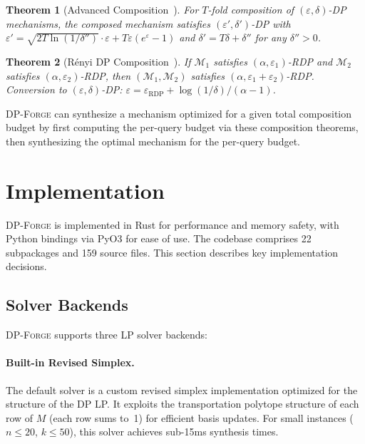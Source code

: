 \documentclass[11pt,a4paper]{article}
\newcommand{\dpforge}{\textsc{DP-Forge}}
\newcommand{\eps}{\varepsilon}
\newcommand{\cM}{\mathcal{M}}
\newtheorem{theorem}{Theorem}[section]
\begin{document}
\begin{theorem}[Advanced Composition~\cite{dwork2010boosting,kairouz2015composition}]
\label{thm:advanced_comp}
For $T$-fold composition of $(\eps, \delta)$-DP mechanisms, the composed
mechanism satisfies $(\eps', \delta')$-DP with
$\eps' = \sqrt{2T \ln(1/\delta'')} \cdot \eps + T\eps(e^\eps - 1)$
and $\delta' = T\delta + \delta''$ for any $\delta'' > 0$.
\end{theorem}

\begin{theorem}[R\'enyi DP Composition~\cite{mironov2017renyi}]
\label{thm:rdp_comp}
If $\cM_1$ satisfies $(\alpha, \eps_1)$-RDP and $\cM_2$ satisfies
$(\alpha, \eps_2)$-RDP, then $(\cM_1, \cM_2)$ satisfies
$(\alpha, \eps_1 + \eps_2)$-RDP.  Conversion to $(\eps, \delta)$-DP:
$\eps = \eps_{\text{RDP}} + \log(1/\delta)/(\alpha - 1)$.
\end{theorem}

\dpforge{} can synthesize a mechanism optimized for a given total composition
budget by first computing the per-query budget via these composition theorems,
then synthesizing the optimal mechanism for the per-query budget.


\section{Implementation}
\label{sec:implementation}

\dpforge{} is implemented in Rust for performance and memory safety, with Python
bindings via PyO3 for ease of use.  The codebase comprises 22 subpackages and
159 source files.  This section describes key implementation decisions.

\subsection{Solver Backends}
\label{subsec:solvers}

\dpforge{} supports three LP solver backends:

\paragraph{Built-in Revised Simplex.}
The default solver is a custom revised simplex implementation optimized for the
structure of the DP LP.  It exploits the transportation polytope structure of each
row of $M$ (each row sums to~1) for efficient basis updates.  For small instances
($n \le 20$, $k \le 50$), this solver achieves sub-15ms synthesis times.
\end{document}
